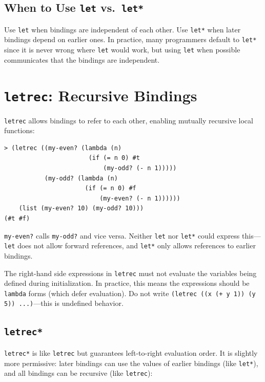 \subsection{When to Use \texttt{let} vs.\ \texttt{let*}}

Use \texttt{let} when bindings are independent of each other. Use \texttt{let*} when later bindings depend on earlier ones. In practice, many programmers default to \texttt{let*} since it is never wrong where \texttt{let} would work, but using \texttt{let} when possible communicates that the bindings are independent.

\section{\texttt{letrec}: Recursive Bindings}

\texttt{letrec} allows bindings to refer to each other, enabling mutually recursive local functions:

\begin{lstlisting}[style=repl]
> (letrec ((my-even? (lambda (n)
                       (if (= n 0) #t
                           (my-odd? (- n 1)))))
           (my-odd? (lambda (n)
                      (if (= n 0) #f
                          (my-even? (- n 1))))))
    (list (my-even? 10) (my-odd? 10)))
(#t #f)
\end{lstlisting}

\texttt{my-even?} calls \texttt{my-odd?} and vice versa. Neither \texttt{let} nor \texttt{let*} could express this---\texttt{let} does not allow forward references, and \texttt{let*} only allows references to earlier bindings.

\begin{warning}
The right-hand side expressions in \texttt{letrec} must not evaluate the variables being defined during initialization. In practice, this means the expressions should be \texttt{lambda} forms (which defer evaluation). Do not write \texttt{(letrec ((x (+ y 1)) (y 5)) ...)}---this is undefined behavior.
\end{warning}

\subsection{\texttt{letrec*}}

\texttt{letrec*} is like \texttt{letrec} but guarantees left-to-right evaluation order. It is slightly more permissive: later bindings can use the values of earlier bindings (like \texttt{let*}), and all bindings can be recursive (like \texttt{letrec}):

